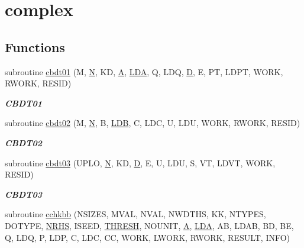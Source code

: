 \hypertarget{group__complex__eig}{}\section{complex}
\label{group__complex__eig}
\subsection*{Functions}
\begin{DoxyCompactItemize}
\item 
subroutine \hyperlink{group__complex__eig_ga799e97bf0e79c0869e150c5de4e12e2a}{cbdt01} (M, \hyperlink{polmisc_8c_a0240ac851181b84ac374872dc5434ee4}{N}, K\+D, \hyperlink{classA}{A}, \hyperlink{example__user_8c_ae946da542ce0db94dced19b2ecefd1aa}{L\+D\+A}, Q, L\+D\+Q, \hyperlink{odrpack_8h_a7dae6ea403d00f3687f24a874e67d139}{D}, E, P\+T, L\+D\+P\+T, W\+O\+R\+K, R\+W\+O\+R\+K, R\+E\+S\+I\+D)
\begin{DoxyCompactList}\small\item\em {\bfseries C\+B\+D\+T01} \end{DoxyCompactList}\item 
subroutine \hyperlink{group__complex__eig_ga53408064a3478ae56564bbf12b391aba}{cbdt02} (M, \hyperlink{polmisc_8c_a0240ac851181b84ac374872dc5434ee4}{N}, B, \hyperlink{example__user_8c_a50e90a7104df172b5a89a06c47fcca04}{L\+D\+B}, C, L\+D\+C, U, L\+D\+U, W\+O\+R\+K, R\+W\+O\+R\+K, R\+E\+S\+I\+D)
\begin{DoxyCompactList}\small\item\em {\bfseries C\+B\+D\+T02} \end{DoxyCompactList}\item 
subroutine \hyperlink{group__complex__eig_gab4e31f7060577f077726594263453bef}{cbdt03} (U\+P\+L\+O, \hyperlink{polmisc_8c_a0240ac851181b84ac374872dc5434ee4}{N}, K\+D, \hyperlink{odrpack_8h_a7dae6ea403d00f3687f24a874e67d139}{D}, E, U, L\+D\+U, S, V\+T, L\+D\+V\+T, W\+O\+R\+K, R\+E\+S\+I\+D)
\begin{DoxyCompactList}\small\item\em {\bfseries C\+B\+D\+T03} \end{DoxyCompactList}\item 
subroutine \hyperlink{group__complex__eig_ga3ca7ddf2fd131cc637d9678a346bd445}{cchkbb} (N\+S\+I\+Z\+E\+S, M\+V\+A\+L, N\+V\+A\+L, N\+W\+D\+T\+H\+S, K\+K, N\+T\+Y\+P\+E\+S, D\+O\+T\+Y\+P\+E, \hyperlink{example__user_8c_aa0138da002ce2a90360df2f521eb3198}{N\+R\+H\+S}, I\+S\+E\+E\+D, \hyperlink{zlaqgs_8c_a0656018abfc9fa2821827415f5d5ea57}{T\+H\+R\+E\+S\+H}, N\+O\+U\+N\+I\+T, \hyperlink{classA}{A}, \hyperlink{example__user_8c_ae946da542ce0db94dced19b2ecefd1aa}{L\+D\+A}, A\+B, L\+D\+A\+B, B\+D, B\+E, Q, L\+D\+Q, P, L\+D\+P, C, L\+D\+C, C\+C, W\+O\+R\+K, L\+W\+O\+R\+K, R\+W\+O\+R\+K, R\+E\+S\+U\+L\+T, I\+N\+F\+O)

\end{DoxyCompactItemize}
